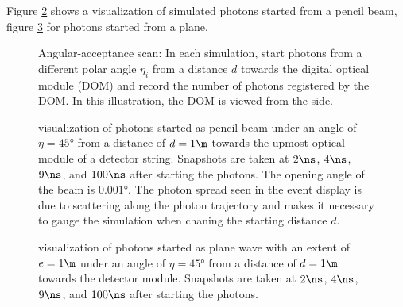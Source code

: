 Figure \ref{fig:Paihah7h} shows a  visualization of simulated photons started from a pencil beam, figure \ref{fig:Aehi7kae} for photons started from a plane.


\begin{figure}[htbp]
  \hfill
  \caption{Angular-acceptance scan: In each simulation, start photons from a different polar angle $\eta_i$ from a distance $d$ towards the digital optical module (DOM) and record the number of photons registered by the DOM. In this illustration, the DOM is viewed from the side.}
  \label{fig:quie8Oof}
\end{figure}

\begin{figure}[htbp]
  \hfill
  \hfill
  \hfill
  \caption{ visualization of photons started as pencil beam under an angle of $\eta = \ang{45}$ from a distance of $d = 1\m$ towards the upmost optical module of a detector string. Snapshots are taken at $2\ns$, $4\ns$, $9\ns$, and $100\ns$ after starting the photons. The opening angle of the beam is $\ang{0.001}$. The photon spread seen in the event display is due to scattering along the photon trajectory and makes it necessary to gauge the simulation when chaning the starting distance $d$.}
  \label{fig:Paihah7h}
\end{figure}

\begin{figure}[htbp]
  \hfill
  \hfill
  \hfill
  \caption{ visualization of photons started as plane wave with an extent of $e = 1\m$ under an angle of $\eta = \ang{45}$ from a distance of $d = 1\m$ towards the detector module. Snapshots are taken at $2\ns$, $4\ns$, $9\ns$, and $100\ns$ after starting the photons.}
  \label{fig:Aehi7kae}
\end{figure}



